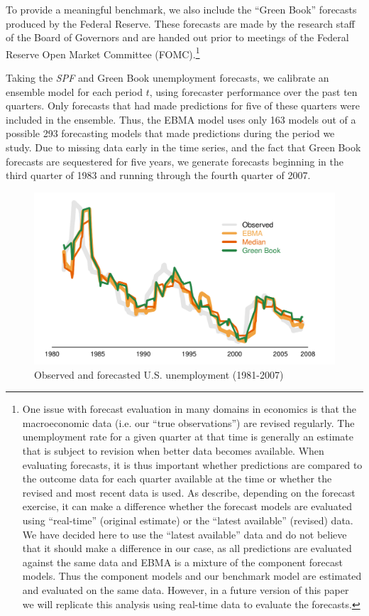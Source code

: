 \documentclass[12pt,fullpage,endnotes]{article}
\begin{document}
To provide a meaningful benchmark, we also include the ``Green Book''
forecasts produced by the Federal Reserve. These forecasts are made by
the research staff of the Board of Governors and are handed out prior
to meetings of the Federal Reserve Open Market Committee
(FOMC).\footnote{One issue with forecast evaluation in many domains in
  economics is that the macroeconomic data (i.e. our ``true
  observations'') are revised regularly. The unemployment rate for a
  given quarter at that time is generally an estimate that is subject
  to revision when better data becomes available. When evaluating
  forecasts, it is thus important whether predictions are compared to
  the outcome data for each quarter available at the time or whether
  the revised and most recent data is used. As
  \citet{Croushore:Stark:2001} describe, depending on the forecast
  exercise, it can make a difference whether the forecast models are
  evaluated using ``real-time'' (original estimate) or the ``latest
  available'' (revised) data. We have decided here to use the ``latest
  available'' data and do not believe that it should make a difference
  in our case, as all predictions are evaluated against the same data
  and EBMA is a mixture of the component forecast models. Thus the
  component models and our benchmark model are estimated and evaluated
  on the same data. However, in a future version of this paper we will
  replicate this analysis using real-time data to evaluate the
  forecasts.} %

Taking the \textit{SPF} and Green Book unemployment forecasts, we
calibrate an ensemble model for each period $t$, using forecaster
performance over the past ten quarters.  Only forecasts that had made
predictions for five of these quarters were included in the ensemble.
Thus, the EBMA model uses only 163 models out of a possible 293
forecasting models that made predictions during the period we study.
Due to missing data early in the time series, and the fact that Green
Book forecasts are sequestered for five years, we generate forecasts
beginning in the third quarter of 1983 and running through the fourth
quarter of 2007.



\begin{figure}[h]
\caption{Observed and forecasted U.S. unemployment (1981-2007)}
\label{timeSeries}
\begin{center}
\includegraphics[scale=.8]{mdwtimeSeries2}
\end{center}
\end{figure}
\end{document}

